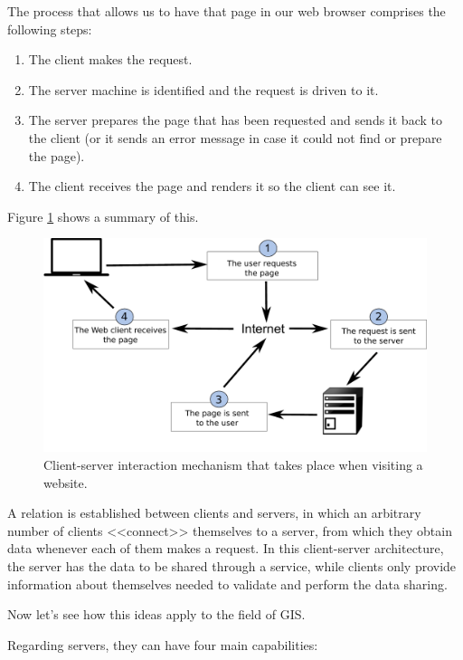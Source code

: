 The process that allows us to have that page in our web browser comprises the following steps:

\begin{enumerate}
	\item The client makes the request.
	\item The server machine is identified and the request is driven to it.
	\item The server prepares the page that has been requested and sends it back to the client (or it sends an error message in case it could not find or prepare the page).
	\item The client receives the page and renders it so the client can see it.
\end{enumerate}


Figure \ref{Fig:How_internet_works} shows a summary of this.

\begin{figure}[!hbt]   
\centering
\includegraphics[width=\columnwidth]{Software/How_internet_works.pdf}
\caption{\small Client-server interaction mechanism that takes place when visiting a website.}
\label{Fig:How_internet_works} 
\end{figure}

A relation is established between clients and servers, in which an arbitrary number of clients <<connect>> themselves to a server, from which they obtain data whenever each of them makes a request. In this client-server architecture, the server has the data to be shared through a service, while clients only provide information about themselves needed to validate and perform the data sharing.

Now let's see how this ideas apply to the field of GIS.

Regarding servers, they can have four main capabilities:

